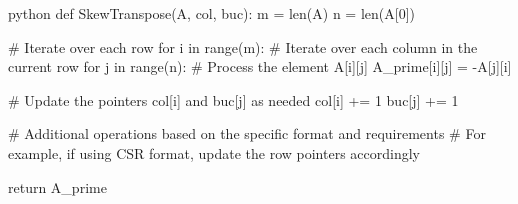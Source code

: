python
def SkewTranspose(A, col, buc):
    m = len(A)
    n = len(A[0])
    
    # Iterate over each row
    for i in range(m):
        # Iterate over each column in the current row
        for j in range(n):
            # Process the element A[i][j]
            A_prime[i][j] = -A[j][i]
            
            # Update the pointers col[i] and buc[j] as needed
            col[i] += 1
            buc[j] += 1
            
            # Additional operations based on the specific format and requirements
            # For example, if using CSR format, update the row pointers accordingly
    
    return A_prime